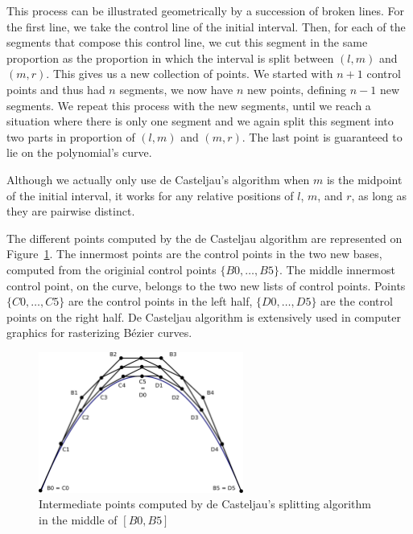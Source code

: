 \documentclass{mscs}
\begin{document}
This process can be illustrated geometrically by a succession of broken
lines.
For the first line, we take the control line of the initial
interval.  Then, for each of the segments that compose this control line,
we cut this segment in the same proportion as the proportion in which
the interval is split between \((l,m)\) and \((m,r)\).  This gives us
a new collection of points.  We started with \(n + 1\) control points and
thus had \(n\) segments, we now have \(n\) new points, defining \(n-1\)
new segments.  We repeat this process with the new segments, until we reach
a situation where there is only one segment and we again split this
segment into two parts in proportion of \((l,m)\) and \((m,r)\).  The
last point is guaranteed to lie on the polynomial's curve.

Although we actually only use de Casteljau's algorithm when \(m\) is
the midpoint of the initial interval, it works for any relative
positions of \(l\), \(m\), and \(r\), as long as they are pairwise distinct.

The different points computed by the de Casteljau algorithm are
represented on Figure~\ref{dichobern}. The innermost points are the
control points in the two new bases, computed from the originial control
points $\{B0, \dots, B5\}$.
The middle innermost control point, on the curve, belongs to the two
new lists of control points. Points $\{C0, \dots, C5\}$ are the
control points in the left half, $\{D0, \dots, D5\}$ are the control
points on the right half.
De Casteljau algorithm is extensively used in computer  graphics for
rasterizing B{\'e}zier curves.

\begin{figure}[h]
\begin{center}
\includegraphics[width=0.6\textwidth]{dicho_bern.pdf}
\caption{\label{dichobern}Intermediate points computed by de Casteljau's
splitting algorithm in the middle of $[B0, B5]$}
\end{center}
\end{figure}
\end{document}
